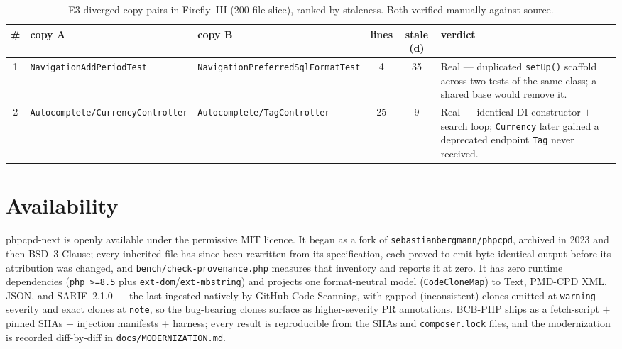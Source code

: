 \documentclass[10pt,a4paper]{article}
\begin{document}
\begin{table}[h]
\centering
\caption{E3 diverged-copy pairs in Firefly~III (200-file slice), ranked by staleness. Both verified
manually against source.}
\label{tab:e3}
\footnotesize
\begin{tabular}{@{}c p{2.6cm} p{2.6cm} c c p{4.0cm}@{}}
\toprule
\textbf{\#} & \textbf{copy A} & \textbf{copy B} & \textbf{lines} & \textbf{stale (d)} & \textbf{verdict} \\
\midrule
1 & \texttt{Navigation\-AddPeriodTest} & \texttt{Navigation\-PreferredSql\-FormatTest} & 4 & 35 &
Real --- duplicated \lstinline!setUp()! scaffold across two tests of the same class; a shared base
would remove it. \\
2 & \texttt{Autocomplete/\-CurrencyController} & \texttt{Autocomplete/\-TagController} & 25 & 9 &
Real --- identical DI constructor $+$ search loop; \texttt{Currency} later gained a deprecated
endpoint \texttt{Tag} never received. \\
\bottomrule
\end{tabular}
\end{table}

\section{Availability}
phpcpd-next is openly available under the permissive MIT licence. It began as a fork of
\texttt{sebastianbergmann/phpcpd}, archived in 2023 and then BSD~3-Clause; every
inherited file has since been rewritten from its specification, each proved to emit byte-identical
output before its attribution was changed, and \texttt{bench/check-provenance.php} measures that
inventory and reports it at zero. It has zero runtime dependencies (\texttt{php >=8.5} plus
\texttt{ext-dom}/\texttt{ext-mbstring}) and projects one format-neutral model
(\lstinline!CodeCloneMap!) to Text, PMD-CPD XML, JSON, and SARIF~2.1.0 --- the last ingested natively
by GitHub Code Scanning, with gapped (inconsistent) clones emitted at \texttt{warning} severity and
exact clones at \texttt{note}, so the bug-bearing clones surface as higher-severity PR annotations.
BCB-PHP ships as a fetch-script $+$ pinned SHAs $+$ injection manifests $+$ harness; every result is
reproducible from the SHAs and \texttt{composer.lock} files, and the modernization is recorded
diff-by-diff in \texttt{docs/MODERNIZATION.md}.
\end{document}
